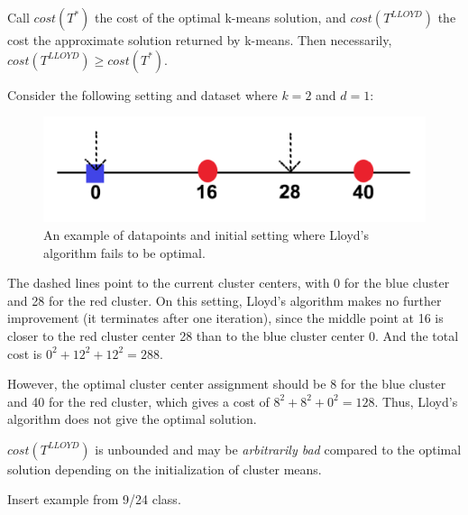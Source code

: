 \begin{remark}
Call $cost(T^*)$ the cost of the optimal k-means solution, and $cost(T^{LLOYD})$ the cost the approximate solution returned by k-means. Then necessarily, $cost(T^{LLOYD}) \geq cost(T^*)$.
\end{remark}

\begin{example} Consider the following setting and dataset
where $k=2$ and $d=1$:
\begin{figure}
    \centering
    \captionsetup{width=0.8\textwidth}
    \includegraphics[scale=0.4]{chapter_1/files/kmeans.png}
    \caption{An example of datapoints and initial setting where
    Lloyd's algorithm fails to be optimal.}
    \label{fig:kmeans}
\end{figure}

The dashed lines point to the current cluster centers, with 0
for the blue cluster and 28 for the red cluster. On this
setting, Lloyd's algorithm makes no further improvement (it
terminates after one iteration), since the middle point at 16
is closer to the red cluster center 28 than to the blue cluster
center 0. And the total cost is $0^2+12^2+12^2=288$.

However, the optimal cluster center assignment should be 8 for
the blue cluster and 40 for the red cluster, which gives a cost
of $8^2+8^2+0^2=128$. Thus, Lloyd's algorithm does not give the
optimal solution.
\end{example}

\begin{remark}
$cost(T^{LLOYD})$ is unbounded and may be \emph{arbitrarily bad} compared to the optimal solution depending on the initialization of cluster means.
\end{remark}

\begin{example} 
Insert example from 9/24 class.  
\end{example}




